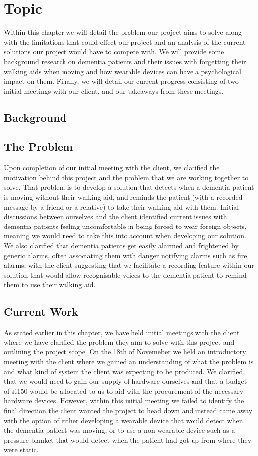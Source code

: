 \chapter{Topic}
\label{chap:topic}

Within this chapter we will detail the problem our project aims to solve along with the limitations that could effect our project and an analysis of the current solutions our project would have to compete with. We will provide some background research on dementia patients and their issues with forgetting their walking aids when moving and how wearable devices can have a psychological impact on them. Finally, we will detail our current progress consisting of two initial meetings with our client, and our takeaways from these meetings.

\section{Background}

\section{The Problem}
    Upon completion of our initial meeting with the client, we clarified the motivation behind this project and the problem that we are working together to solve. That problem is to develop a solution that detects when a dementia patient is moving without their walking aid, and reminds the patient (with a recorded message by a friend or a relative) to take their walking aid with them. Initial discussions between ourselves and the client identified current issues with dementia patients feeling uncomfortable in being forced to wear foreign objects, meaning we would need to take this into account when developing our solution. We also clarified that dementia patients get easily alarmed and frightened by generic alarms, often associating them with danger notifying alarms such as fire alarms, with the client suggesting that we facilitate a recording feature within our solution that would allow recognisable voices to the dementia patient to remind them to use their walking aid.

\section{Current Work}
    As stated earlier in this chapter, we have held initial meetings with the client where we have clarified the problem they aim to solve with this project and outlining the project scope. On the 18th of Novemeber we held an introductory meeting with the client where we gained an understanding of what the problem is and what kind of system the client was expecting to be produced. We clarified that we would need to gain our supply of hardware ourselves and that a budget of £150 would be allocated to us to aid with the procurement of the necessary hardware devices. However, within this initial meeting we failed to identify the final direction the client wanted the project to head down and instead came away with the option of either developing a wearable device that would detect when the dementia patient was moving, or to use a non-wearable device such as a pressure blanket that would detect when the patient had got up from where they were static.
